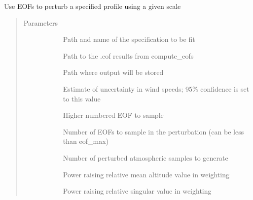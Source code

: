 \documentclass[letterpaper,10pt,english]{sphinxmanual}
\begin{document}
\begin{fulllineitems}
\label{\detokenize{stochprop.eofs:stochprop.eofs.perturb_atmo}}
Use EOFs to perturb a specified profile using a given scale
\begin{quote}\begin{description}
\item[{Parameters}] \leavevmode\begin{description}
\item[{}] \leavevmode
Path and name of the specification to be fit

\item[{}] \leavevmode
Path to the .eof results from compute\_eofs

\item[{}] \leavevmode
Path where output will be stored

\item[{}] \leavevmode
Estimate of uncertainty in wind speeds; 95\% confidence is set to this value

\item[{}] \leavevmode
Higher numbered EOF to sample

\item[{}] \leavevmode
Number of EOFs to sample in the perturbation (can be less than eof\_max)

\item[{}] \leavevmode
Number of perturbed atmospheric samples to generate

\item[{}] \leavevmode
Power raising relative mean altitude value in weighting

\item[{}] \leavevmode
Power raising relative singular value in weighting

\end{description}

\end{description}\end{quote}

\end{fulllineitems}
\end{document}
